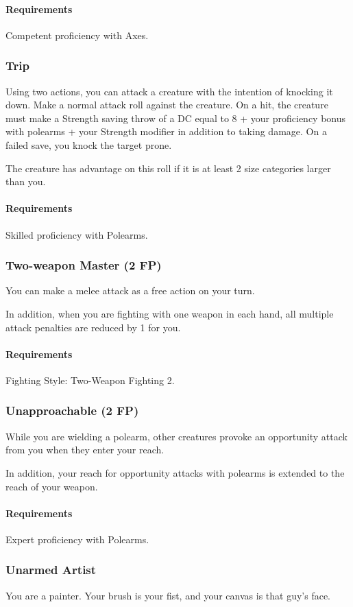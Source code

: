     \paragraph{Requirements} Competent proficiency with Axes.
\subsubsection{Trip} \label{feat::trip}
    Using two actions, you can attack a creature with the intention of knocking it down.
    Make a normal attack roll against the creature.
    On a hit, the creature must make a Strength saving throw of a DC equal to 8 + your proficiency bonus with polearms + your Strength modifier in addition to taking damage.
    On a failed save, you knock the target prone.

    The creature has advantage on this roll if it is at least 2 size categories larger than you.
    \paragraph{Requirements} Skilled proficiency with Polearms.
\subsubsection{Two-weapon Master (2 FP)} \label{feat::twoweaponmaster}
    You can make a melee attack as a free action on your turn.

    In addition, when you are fighting with one weapon in each hand, all multiple attack penalties are reduced by 1 for you.
    \paragraph{Requirements} Fighting Style: Two-Weapon Fighting 2.
\subsubsection{Unapproachable (2 FP)} \label{feat::unapproachable}
    While you are wielding a polearm, other creatures provoke an opportunity attack from you when they enter your reach.

    In addition, your reach for opportunity attacks with polearms is extended to the reach of your weapon.
    \paragraph{Requirements} Expert proficiency with Polearms.
\subsubsection{Unarmed Artist} \label{feat::unarmedartist}
    You are a painter.
    Your brush is your fist, and your canvas is that guy's face.

